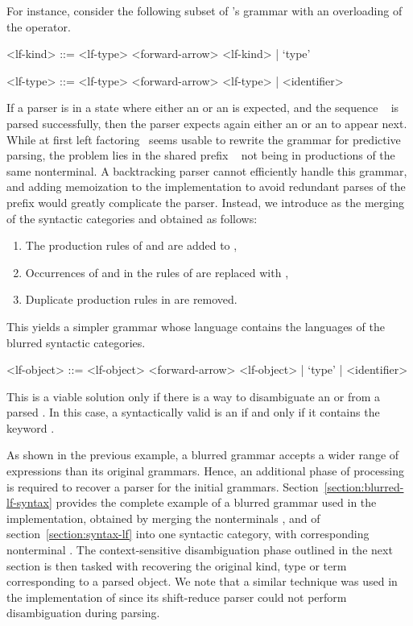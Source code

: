 For instance, consider the following subset of \Beluga's grammar with an overloading of the  operator.
\begin{grammar}
<lf-kind> ::= <lf-type> <forward-arrow> <lf-kind> | `type'

<lf-type> ::= <lf-type> <forward-arrow> <lf-type> | <identifier>
\end{grammar}
If a parser is in a state where either an  or an  is expected, and the sequence ~ is parsed successfully, then the parser expects again either an  or an  to appear next.
While at first left factoring~\cite{aho2007compilers} seems usable to rewrite the grammar for predictive parsing, the problem lies in the shared prefix ~ not being in productions of the same nonterminal.
A backtracking parser cannot efficiently handle this grammar, and adding memoization to the implementation to avoid redundant parses of the prefix would greatly complicate the parser.
Instead, we introduce  as the merging of the syntactic categories  and  obtained as follows:
\begin{enumerate}
\item The production rules of  and  are added to ,
\item Occurrences of  and  in the rules of  are replaced with ,
\item Duplicate production rules in  are removed.
\end{enumerate}
This yields a simpler grammar whose language contains the languages of the blurred syntactic categories.
\begin{grammar}
<lf-object> ::= <lf-object> <forward-arrow> <lf-object> | `type' | <identifier>
\end{grammar}
This is a viable solution only if there is a way to disambiguate an  or  from a parsed .
In this case, a syntactically valid  is an  if and only if it contains the keyword .

As shown in the previous example, a blurred grammar accepts a wider range of expressions than its original grammars.
Hence, an additional phase of processing is required to recover a parser for the initial grammars.
Section~\ref{section:blurred-lf-syntax} provides the complete example of a blurred grammar used in the implementation, obtained by merging the nonterminals ,  and  of section~\ref{section:syntax-lf} into one syntactic category, with corresponding nonterminal .
The context-sensitive disambiguation phase outlined in the next section is then tasked with recovering the original \LF kind, type or term corresponding to a parsed \LF object.
We note that a similar technique was used in the implementation of \Twelf since its shift-reduce parser could not perform disambiguation during parsing.


